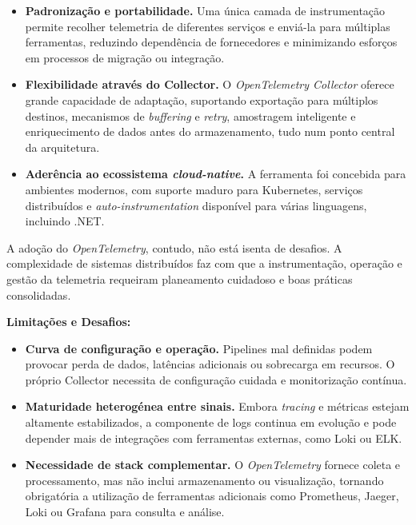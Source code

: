 \begin{itemize}
    \item \textbf{Padronização e portabilidade.} Uma única camada de instrumentação permite recolher telemetria de diferentes serviços e enviá-la para múltiplas ferramentas, reduzindo dependência de fornecedores e minimizando esforços em processos de migração ou integração.
    
    \item \textbf{Flexibilidade através do Collector.} O \textit{OpenTelemetry Collector} oferece grande capacidade de adaptação, suportando exportação para múltiplos destinos, mecanismos de \textit{buffering} e \textit{retry}, amostragem inteligente e enriquecimento de dados antes do armazenamento, tudo num ponto central da arquitetura.
    
    \item \textbf{Aderência ao ecossistema \textit{cloud-native}.} A ferramenta foi concebida para ambientes modernos, com suporte maduro para Kubernetes, serviços distribuídos e \textit{auto-instrumentation} disponível para várias linguagens, incluindo .NET.
\end{itemize}

A adoção do \textit{OpenTelemetry}, contudo, não está isenta de desafios. A complexidade de sistemas distribuídos faz com que a instrumentação, operação e gestão da telemetria requeiram planeamento cuidadoso e boas práticas consolidadas.

\textbf{Limitações e Desafios:}

\begin{itemize}
    \item \textbf{Curva de configuração e operação.} Pipelines mal definidas podem provocar perda de dados, latências adicionais ou sobrecarga em recursos. O próprio Collector necessita de configuração cuidada e monitorização contínua.
    
    \item \textbf{Maturidade heterogénea entre sinais.} Embora \textit{tracing} e métricas estejam altamente estabilizados, a componente de logs continua em evolução e pode depender mais de integrações com ferramentas externas, como Loki ou ELK.
    
    \item \textbf{Necessidade de stack complementar.} O \textit{OpenTelemetry} fornece coleta e processamento, mas não inclui armazenamento ou visualização, tornando obrigatória a utilização de ferramentas adicionais como Prometheus, Jaeger, Loki ou Grafana para consulta e análise.
\end{itemize}

